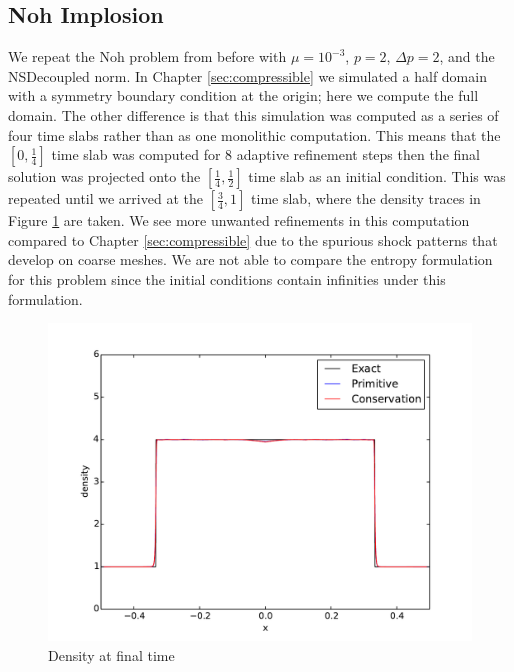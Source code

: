 \documentclass[Dissertation.tex]{subfiles}
\begin{document}
\subsection{Noh Implosion}
We repeat the Noh problem from before with $\mu=10^{-3}$, $p=2$, $\Delta p=2$, and the NSDecoupled norm.
In Chapter \ref{sec:compressible} we simulated a half domain with a symmetry boundary condition
at the origin; here we compute the full domain.
The other difference is that this simulation was computed as a series of four time slabs 
rather than as one monolithic computation.
This means that the $[0,\frac{1}{4}]$ time slab was computed for 8 adaptive refinement steps
then the final solution was projected onto the $[\frac{1}{4},\frac{1}{2}]$ time slab as an 
initial condition.
This was repeated until we arrived at the $[\frac{3}{4},1]$ time slab, where the density traces
in Figure \ref{fig:NohDen} are taken.
We see more unwanted refinements in this computation compared to Chapter \ref{sec:compressible}
due to the spurious shock patterns that develop on coarse meshes.
We are not able to compare the entropy formulation for this problem since the initial conditions 
contain infinities under this formulation.

\begin{figure}[ht]
\centering
\includegraphics[width=\textwidth]{Noh/FormulationComparison/den9.pdf}
\caption{Density at final time}
\label{fig:NohDen}
\end{figure}
\end{document}
